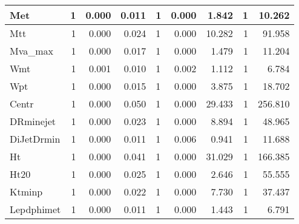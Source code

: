 \begin{table}[htbp]
\begin{center}
\begin{tabular}{|l|r|r|r|l|r|r|r|r|}
\textsf{Met} & 1 & 0.000 & 0.011 & 1 & 0.000 & 1.842 & 1 & 10.262 \\ \hline
\textsf{Mtt} & 1 & 0.000 & 0.024 & 1 & 0.000 & 10.282 & 1 & 91.958 \\ \hline
\textsf{Mva\_max} & 1 & 0.000 & 0.017 & 1 & 0.000 & 1.479 & 1 & 11.204 \\ \hline
\textsf{Wmt} & 1 & 0.001 & 0.010 & 1 & 0.002 & 1.112 & 1 & 6.784 \\ \hline
\textsf{Wpt} & 1 & 0.000 & 0.015 & 1 & 0.000 & 3.875 & 1 & 18.702 \\ \hline
\textsf{Centr} & 1 & 0.000 & 0.050 & 1 & 0.000 & 29.433 & 1 & 256.810 \\ \hline
\textsf{DRminejet} & 1 & 0.000 & 0.023 & 1 & 0.000 & 8.894 & 1 & 48.965 \\ \hline
\textsf{DiJetDrmin} & 1 & 0.000 & 0.011 & 1 & 0.006 & 0.941 & 1 & 11.688 \\ \hline
\textsf{Ht} & 1 & 0.000 & 0.041 & 1 & 0.000 & 31.029 & 1 & 166.385 \\ \hline
\textsf{Ht20} & 1 & 0.000 & 0.025 & 1 & 0.000 & 2.646 & 1 & 55.555 \\ \hline
\textsf{Ktminp} & 1 & 0.000 & 0.022 & 1 & 0.000 & 7.730 & 1 & 37.437 \\ \hline
\textsf{Lepdphimet} & 1 & 0.000 & 0.011 & 1 & 0.000 & 1.443 & 1 & 6.791 \\ \hline
\end{tabular}
\end{center}
\label{tab:m4j-tests}
\end{table}
